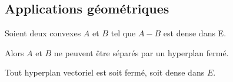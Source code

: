 \subsection{Applications géométriques}

\begin{corollary}
	Soient deux convexes $A$ et $B$ tel que $A-B$ est dense dans E.

	Alors $A$ et $B$ ne peuvent être séparés par un hyperplan fermé.
\end{corollary}

\begin{corollary}
	Tout hyperplan vectoriel est soit fermé, soit dense dans $E$.
\end{corollary}
